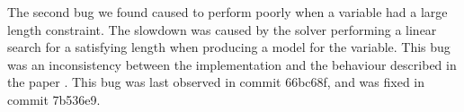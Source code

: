         The second bug we found caused \us{} to perform poorly when a variable had a large length constraint. The slowdown was caused by the solver performing a linear search for a satisfying length when producing a model for the variable. This bug was an inconsistency between the implementation and the behaviour described in the \us{} paper \cite{z3str3}. This bug was last observed in commit 66bc68f, and was fixed in commit 7b536e9.


